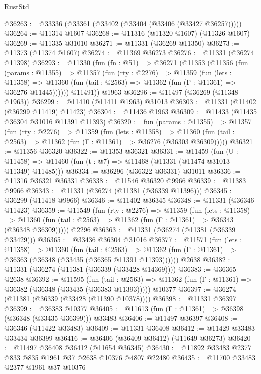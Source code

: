 \begin{lexlean}{RustStd}
\begin{coremodule}
@36263 := @33336 (@33361 (@33402 (@33404 (@33406 (@33427 @36257)))))
@36264 := @11314 @1607
@36268 := @11316 (@11320 @1607) (@11326 @1607)
@36269 := @11335 @31010
@36271 := @11331 (@36269 @11350)
@36273 := @11373 (@11374 @1607)
@36274 := @11369 @36273
@36276 := @11331 (@36274 @11398)
@36293 := @11330
    (fun (fn : @51) =>
    @36271
      (@11353
        (@11356
          (fun (params : @11355) =>
          @11357
            (fun (rty : @2276) =>
            @11359
              (fun (lets : @11358) =>
              @11360 (fun (tail : @2563) => @11362 (fun (Γ : @11361) => @36276 @11445))))))
        @11491))
    @1963
@36296 := @11497 (@36269 (@11348 @1963))
@36299 := @11410 (@11411 @1963) @31013
@36303 := @11331 (@11402 (@36299 @11419) @11423)
@36304 := @11436 @1963
@36309 := @11433 (@11435 @36304 @31016 @11391 @11393)
@36320 := fun (params : @11355) =>
  @11357
    (fun (rty : @2276) =>
    @11359
      (fun (lets : @11358) =>
      @11360 (fun (tail : @2563) => @11362 (fun (Γ : @11361) => @36276 (@36303 @36309)))))
@36321 := @11356 @36320
@36322 := @11353 @36321
@36331 := @11459
    (fun (U : @11458) => @11460 (fun (t : @7) => @11468 (@11331 (@11474 @31013 @11349) @11485)))
@36334 := @36296 (@36322 @36331) @31011
@36336 := @11316 @36321 @36331
@36338 := @11546 @36320 @9966
@36339 := @11383 @9966
@36343 := @11331 (@36274 (@11381 (@36339 @11396)))
@36345 := @36299 (@11418 @9966)
@36346 := @11402 @36345
@36348 := @11331 (@36346 @11423)
@36359 := @11549
    (fun (rty : @2276) =>
    @11359
      (fun (lets : @11358) =>
      @11360 (fun (tail : @2563) => @11362 (fun (Γ : @11361) => @36343 (@36348 @36309)))))
    @2296
@36363 := @11331 (@36274 (@11381 (@36339 @33429)))
@36365 := @33436 @36304 @31016
@36377 := @11571
    (fun (lets : @11358) =>
    @11360
      (fun (tail : @2563) =>
      @11362 (fun (Γ : @11361) => @36363 (@36348 (@33435 (@36365 @11391 @11393))))))
    @2638
@36382 := @11331 (@36274 (@11381 (@36339 (@33428 @14369))))
@36383 := @36365 @2638
@36392 := @11595
    (fun (tail : @2563) => @11362 (fun (Γ : @11361) => @36382 (@36348 (@33435 (@36383 @11393)))))
    @10377
@36397 := @36274 (@11381 (@36339 (@33428 (@11390 @10378))))
@36398 := @11331 @36397
@36399 := @36383 @10377
@36405 := @11613 (fun (Γ : @11361) => @36398 (@36348 (@33435 @36399))) @33483
@36406 := @11497 @36397
@36408 := @36346 (@11422 @33483)
@36409 := @11331 @36408
@36412 := @11429 @33483 @33434 @36399
@36416 := @36406 (@36409 @36412) (@11649 @36273)
@36420 := @11497 @36408 @36412 (@11654 @36345)
@36430 := @11892 @33483 @2377 @833 @835 @1961 @37 @2638 @10376 @4807 @22480
@36435 := @11700 @33483 @2377 @1961 @37 @10376

\end{coremodule}
\end{lexlean}
